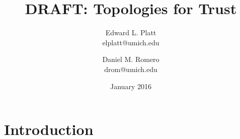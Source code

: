 \documentclass[twocolumn]{article}
\title{DRAFT: Topologies for Trust}
\author{
Edward L. Platt \\
elplatt@umich.edu
\and
Daniel M. Romero \\
drom@umich.edu
}
\date{January 2016}
\begin{document}
\maketitle

\section{Introduction}



\end{document}
